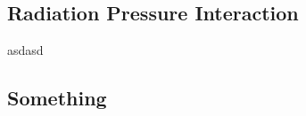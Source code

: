 \documentclass[main.tex]{subfiles}
\begin{document}
\subsection{Radiation Pressure Interaction}
asdasd
\subsection{Something}
\end{document}
